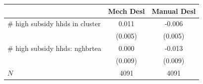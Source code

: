 \begin{tabular}{lcc}
\hline\hline
 & Mech Desl & Manual Desl \\
\hline
# high subsidy hhds in cluster & 0.011 & -0.006 \\
 & (0.005) & (0.005) \\
# high subsidy hhds: nghbrtea & 0.000 & -0.013 \\
 & (0.009) & (0.009) \\
\hline
$N$ & 4091 & 4091 \\
\hline\hline
\end{tabular}

